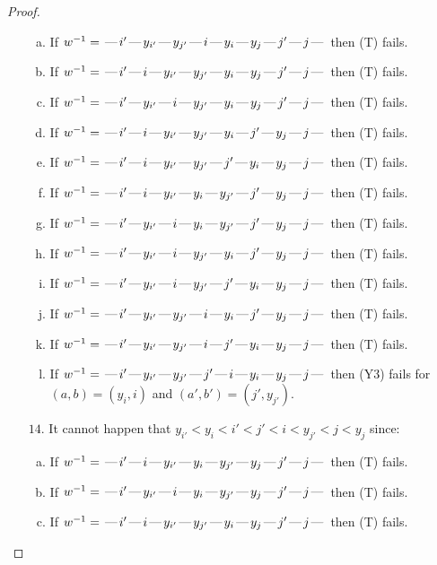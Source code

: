 \documentclass[10pt]{article}
\theoremstyle{definition}
\theoremstyle{definition}
\def\dash{\text{\hspace{0.5mm}---\hspace{0.5mm}}}
\begin{document}
\begin{proof}
\begin{enumerate}
\begin{enumerate}[(a)]
\item If $w^{-1} = \dash i'\dash y_{i'}\dash y_{j'}\dash i\dash y_i\dash y_j\dash j'\dash j\dash $ then (T) fails.
\item If $w^{-1} = \dash i'\dash i\dash y_{i'}\dash y_{j'}\dash y_i\dash y_j\dash j'\dash j\dash $ then (T) fails.
\item If $w^{-1} = \dash i'\dash y_{i'}\dash i\dash y_{j'}\dash y_i\dash y_j\dash j'\dash j\dash $ then (T) fails.
\item If $w^{-1} = \dash i'\dash i\dash y_{i'}\dash y_{j'}\dash y_i\dash j'\dash y_j\dash j\dash $ then (T) fails.
\item If $w^{-1} = \dash i'\dash i\dash y_{i'}\dash y_{j'}\dash j'\dash y_i\dash y_j\dash j\dash $ then (T) fails.
\item If $w^{-1} = \dash i'\dash i\dash y_{i'}\dash y_i\dash y_{j'}\dash j'\dash y_j\dash j\dash $ then (T) fails.
\item If $w^{-1} = \dash i'\dash y_{i'}\dash i\dash y_i\dash y_{j'}\dash j'\dash y_j\dash j\dash $ then (T) fails.
\item If $w^{-1} = \dash i'\dash y_{i'}\dash i\dash y_{j'}\dash y_i\dash j'\dash y_j\dash j\dash $ then (T) fails.
\item If $w^{-1} = \dash i'\dash y_{i'}\dash i\dash y_{j'}\dash j'\dash y_i\dash y_j\dash j\dash $ then (T) fails.
\item If $w^{-1} = \dash i'\dash y_{i'}\dash y_{j'}\dash i\dash y_i\dash j'\dash y_j\dash j\dash $ then (T) fails.
\item If $w^{-1} = \dash i'\dash y_{i'}\dash y_{j'}\dash i\dash j'\dash y_i\dash y_j\dash j\dash $ then (T) fails.
\item If $w^{-1} = \dash i'\dash y_{i'}\dash y_{j'}\dash j'\dash i\dash y_i\dash y_j\dash j\dash $ then (Y3) fails for $(a,b)=(y_i,i)$ and $(a',b')=(j',y_{j'})$.
\end{enumerate}
\item[$14$.] It cannot happen that $y_{i'} < y_i < i' < j' < i < y_{j'} < j < y_j$ since:
\begin{enumerate}[(a)]
\item If $w^{-1} = \dash i'\dash i\dash y_{i'}\dash y_i\dash y_{j'}\dash y_j\dash j'\dash j\dash $ then (T) fails.
\item If $w^{-1} = \dash i'\dash y_{i'}\dash i\dash y_i\dash y_{j'}\dash y_j\dash j'\dash j\dash $ then (T) fails.
\item If $w^{-1} = \dash i'\dash i\dash y_{i'}\dash y_{j'}\dash y_i\dash y_j\dash j'\dash j\dash $ then (T) fails.

\end{enumerate}
\end{enumerate}
\end{proof}
\end{document}
